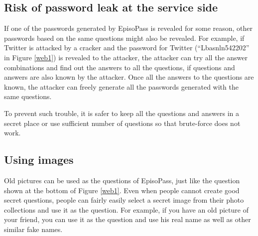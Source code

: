 \documentclass[runningheads,a4paper]{llncs}
\begin{document}
% 
% 
%

\subsection{Risk of password leak at the service side}

If one of the passwords generated by EpisoPass is revealed
for some reason, other passwords based on the same questions
might also be revealed.
%
For example, if Twitter is attacked by a cracker and
the password for Twitter (``\textsf{Lbasnln542202}'' in Figure \ref{web1})
is revealed to the attacker,
the attacker can try all the answer combinations and find out
the answers to all the questions,
if questions and answers are also known by the attacker.
Once all the answers to the questions are known,
the attacker can freely generate all the passwords
generated with the same questions.

To prevent such trouble, it is safer to keep all the questions and answers
in a secret place or
use sufficient number of questions so that brute-force does not work.

\subsection{Using images}

Old pictures can be used as the questions of EpisoPass,
just like the question shown at the bottom of Figure \ref{web1}.
Even when people cannot create good secret questions,
people can fairly easily select a secret image from their photo collections
and use it as the question.
For example, if you have an old picture of your friend,
you can use it as the question
and use his real name as well as other similar fake names.

\end{document}
